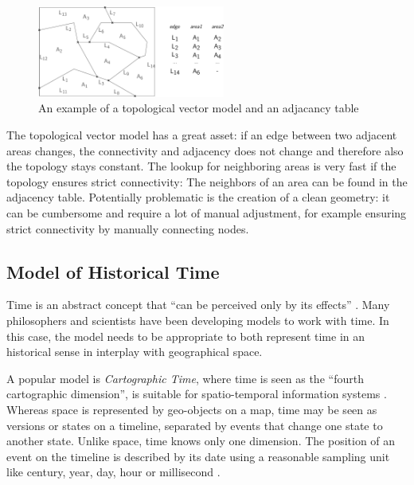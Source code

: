 \begin{figure}[ht]
  \centering
  \includegraphics[width=0.55\textwidth]{graphics/basics/topological_vector_model}
  \caption{An example of a topological vector model and an adjacancy table}
  \label{fig:topological_vector_model}
\end{figure}

The topological vector model has a great asset: if an edge between two adjacent areas changes, the connectivity and adjacency does not change and therefore also the topology stays constant. The lookup for neighboring areas is very fast if the topology ensures strict connectivity: The neighbors of an area can be found in the adjacency table. Potentially problematic is the creation of a clean geometry: it can be cumbersome and require a lot of manual adjustment, for example ensuring strict connectivity by manually connecting nodes.




\subsection{Model of Historical Time} %
\label{sub:model_of_historical_time}

Time is an abstract concept that ``can be perceived only by its effects''
\cite[p. 27]{Langran1989timeingis}.
Many philosophers and scientists have been developing models to work with time. In this case, the model needs to be appropriate to both represent time in an historical sense in interplay with geographical space.

A popular model is \emph{Cartographic Time}, where time is seen as the ``fourth cartographic dimension'', is suitable for spatio-temporal information systems
\cite[p. 28]{Langran1989timeingis}.
Whereas space is represented by geo-objects on a map, time may be seen as versions or states on a timeline, separated by events that change one state to another state.
Unlike space, time knows only one dimension.
The position of an event on the timeline is described by its date using a reasonable sampling unit like century, year, day, hour or millisecond
\cite[p. 32]{Langran1989timeingis}.

